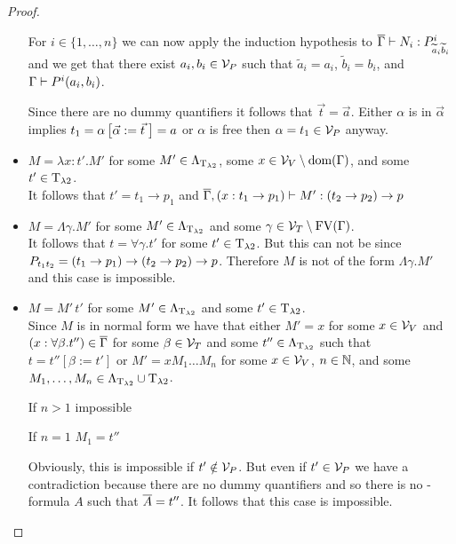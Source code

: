 \begin{proof}
\begin{itemize}
		For $i\in\{1,\dots,n\}$ we can now apply the induction hypothesis to $\overline{\Gamma}\vdash N_i:P^i_{\widetilde{a}_i\widetilde{b}_i}$ and we get that there exist $a_i,b_i\in\mathcal{V}_P$ such that $\widetilde{a}_i=a_i$, $\widetilde{b}_i=b_i$, and $\Gamma\vdash P^i(a_i,b_i)$.
		
		Since there are no dummy quantifiers it follows that $\vec{t}=\vec{a}$. Either $\alpha$ is in $\vec{\alpha}$ implies $t_1=\alpha\left[\vec{\alpha}:=\vec{t}\hspace{1mm}\right]=a$ or $\alpha$ is free then $\alpha=t_1\in\mathcal{V}_P$ anyway.
		
		\begin{figure}[H]
			\centering
			
		\end{figure}
		
	\item[] \underline{$M=\lambda x:t'.M'$} for some $M'\in\Lambda_{\text{T}_{\lambda2}}$, some $x\in\mathcal{V}_V\setminus\text{dom}(\Gamma)$, and some $t'\in\text{T}_{\lambda2}$.\\
		It follows that $t'=t_1\to p_1$ and $\overline{\Gamma},(x:t_1\to p_1)\vdash M':(t_2\to p_2)\to p$
		
		\begin{figure}[H]
			\centering
			
		\end{figure}
	\item[] \underline{$M=\Lambda\gamma.M'$} for some $M'\in\Lambda_{\text{T}_{\lambda2}}$ and some $\gamma\in\mathcal{V}_T\setminus\text{FV}(\Gamma)$.\\
		It follows that $t=\forall\gamma.t'$ for some $t'\in\text{T}_{\lambda2}$.
		But this can not be since $P_{t_1t_2}=(t_1\to p_1)\to(t_2\to p_2)\to p$. Therefore $M$ is not of the form $\Lambda\gamma.M'$ and this case is impossible.

	\item[] \underline{$M=M'\,t'$} for some $M'\in\Lambda_{\text{T}_{\lambda2}}$ and some $t'\in\text{T}_{\lambda2}$.\\
		Since $M$ is in normal form we have that either $M'=x$ for some $x\in\mathcal{V}_V$ and $(x:\forall\beta.t'')\in\overline{\Gamma}$ for some $\beta\in\mathcal{V}_T$ and some $t''\in\Lambda_{\text{T}_{\lambda2}}$ such that $t=t''\left[\beta:=t'\right]$ or $M'=xM_1\dots M_n$ for some $x\in\mathcal{V}_V$, $n\in\mathbb{N}$, and some $M_1,\dots,M_n\in\Lambda_{\text{T}_{\lambda2}}\cup\text{T}_{\lambda2}$.
		
		If $n>1$ impossible
		
		If $n=1$ $M_1=t''$
		
		Obviously, this is impossible if $t'\notin\mathcal{V}_P$. But even if $t'\in\mathcal{V}_P$ we have a contradiction because there are no dummy quantifiers and so there is no \SysP-formula $A$ such that $\overline{A}=t''$. %
		It follows that this case is impossible.
\end{itemize}
\end{proof}

